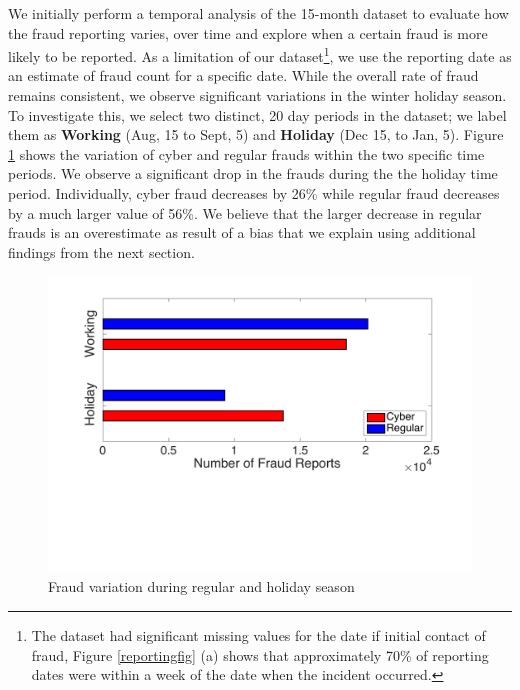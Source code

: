 \documentclass[conference]{IEEEtran}
\begin{document}
We initially perform a temporal analysis of the 15-month dataset to evaluate how the fraud reporting varies, over time and explore when a certain fraud is more likely to be reported. As a limitation of our dataset\footnote{The dataset had significant missing values for the date if initial contact of fraud, Figure \ref{reportingfig} (a) shows that approximately 70\% of reporting dates were within a week of the date when the incident occurred.}, we use the reporting date as an estimate of fraud count for a specific date. While the overall rate of fraud remains consistent, we observe significant variations in the winter holiday season. To investigate this, we select two distinct, 20 day periods in the dataset; we label them as \textbf{Working} (Aug, 15  to Sept, 5) and \textbf{Holiday} (Dec 15, to Jan, 5). Figure \ref{temporal} shows the variation of cyber and regular frauds within the two specific time periods. We observe a significant drop in the frauds during the the holiday time period. Individually, cyber fraud decreases by 26\% while  regular fraud decreases by a much larger value of 56\%. We believe that the larger decrease in regular frauds is an overestimate as result of a bias that we explain using additional findings from the next section.

\begin{figure}[t]
\centering
  \includegraphics[scale=0.35]{graphics/reg_vs_holiday.pdf}
  \caption{Fraud variation during regular and holiday season}
  \label{temporal}
\end{figure}
\end{document}
